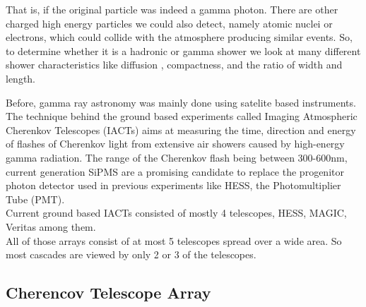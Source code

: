 \documentclass[12pt,article,type=msc,colorback,accentcolor=tud9c]{tudthesis}
\begin{document}
That is, if the original particle was indeed a gamma photon. There are other charged high energy particles we could also detect, namely atomic nuclei or electrons, which could collide with the atmosphere producing similar events. So, to determine whether it is a hadronic or gamma shower we look at many different shower characteristics like diffusion , compactness, and the ratio of width and length.





Before, gamma ray astronomy was mainly done using satelite based instruments. The technique behind the ground based experiments called Imaging Atmospheric Cherenkov Telescopes (IACTs) aims at measuring the time, direction and energy of flashes of Cherenkov light from extensive air showers caused by high-energy gamma radiation. The range of the Cherenkov flash being between 300-600nm, current generation SiPMS are a promising candidate to replace the progenitor photon detector used in previous experiments like HESS, the Photomultiplier Tube (PMT).\\
Current ground based IACTs consisted of mostly 4 telescopes,  HESS, MAGIC, Veritas among them.\\
All of those arrays consist of at most 5 telescopes spread over a wide area. So most cascades are viewed by only 2 or 3 of the telescopes.

\subsection{Cherencov Telescope Array}
\end{document}
